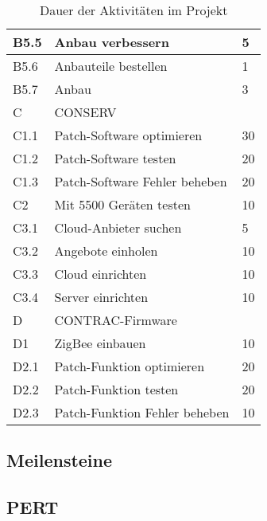 \begin{table}[H]
\begin{center}
\begin{tabular}{l|l|l}
            B5.5 & Anbau verbessern                                    &5\\ \hline
            B5.6 & Anbauteile bestellen                                &1\\ \hline
            B5.7 & Anbau                                               &3\\ \hline
            C    & \multicolumn{2}{l}{CONSERV}\\ \hline
            C1.1 & Patch-Software optimieren                           &30\\ \hline
            C1.2 & Patch-Software testen                               &20\\ \hline
            C1.3 & Patch-Software Fehler beheben                       &20\\ \hline
            C2   & Mit 5500 Geräten testen                             &10\\ \hline
            C3.1 & Cloud-Anbieter suchen                               &5\\ \hline
            C3.2 & Angebote einholen                                   &10\\ \hline
            C3.3 & Cloud einrichten                                    &10\\ \hline
            C3.4 & Server einrichten                                   &10\\ \hline
            D    & \multicolumn{2}{l}{CONTRAC-Firmware}\\ \hline
            D1   & ZigBee einbauen                                     &10\\ \hline
            D2.1 & Patch-Funktion optimieren                           &20\\ \hline
            D2.2 & Patch-Funktion testen                               &20\\ \hline
            D2.3 & Patch-Funktion Fehler beheben                       &10\\
        \end{tabular}
        \caption{Dauer der Aktivitäten im Projekt}
    \end{center}
\end{table}

\subsection{Meilensteine}

\subsection{PERT} %

